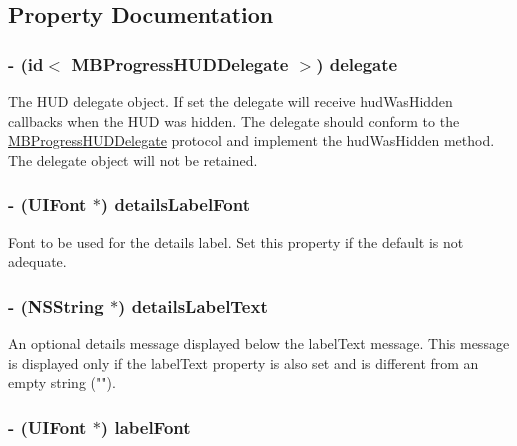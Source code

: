 \subsection{Property Documentation}
\hypertarget{interface_m_b_progress_h_u_d_a81a508c2375e4e97d5450bc3898ff7d9}{
\subsubsection[{delegate}]{\setlength{\rightskip}{0pt plus 5cm}-\/ (id$<$ {\bf MBProgressHUDDelegate} $>$) delegate}}
\label{interface_m_b_progress_h_u_d_a81a508c2375e4e97d5450bc3898ff7d9}
The HUD delegate object. If set the delegate will receive hudWasHidden callbacks when the HUD was hidden. The delegate should conform to the \hyperlink{protocol_m_b_progress_h_u_d_delegate-p}{MBProgressHUDDelegate} protocol and implement the hudWasHidden method. The delegate object will not be retained. \hypertarget{interface_m_b_progress_h_u_d_af3a772e02286bf867c2b4c2213be0180}{
\subsubsection[{detailsLabelFont}]{\setlength{\rightskip}{0pt plus 5cm}-\/ (UIFont $\ast$) detailsLabelFont}}
\label{interface_m_b_progress_h_u_d_af3a772e02286bf867c2b4c2213be0180}
Font to be used for the details label. Set this property if the default is not adequate. \hypertarget{interface_m_b_progress_h_u_d_ab5ad528a731e513b39e3183129af1f37}{
\subsubsection[{detailsLabelText}]{\setlength{\rightskip}{0pt plus 5cm}-\/ ({\bf NSString} $\ast$) detailsLabelText}}
\label{interface_m_b_progress_h_u_d_ab5ad528a731e513b39e3183129af1f37}
An optional details message displayed below the labelText message. This message is displayed only if the labelText property is also set and is different from an empty string (""). \hypertarget{interface_m_b_progress_h_u_d_a85b03f18b8313f4c3efc2002ad79ff27}{
\subsubsection[{labelFont}]{\setlength{\rightskip}{0pt plus 5cm}-\/ (UIFont $\ast$) labelFont}}

